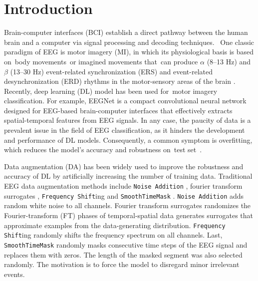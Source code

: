 \documentclass[runningheads]{llncs}
\begin{document}
\section{Introduction}

Brain-computer interfaces (BCI) establish a direct pathway between the human brain and a computer via signal processing and decoding techniques.  One classic paradigm of EEG is motor imagery (MI), in which its physiological basis is based on body movements or imagined movements that can produce $\alpha$ (8–13 Hz) and $\beta$ (13–30 Hz) event-related synchronization (ERS) and event-related desynchronization (ERD) rhythms in the motor-sensory areas of the brain \cite{wolpaw2013brain}. Recently, deep learning (DL) model has been used for motor imagery classification. For example, EEGNet \cite{lawhern2018eegnet} is a compact convolutional neural network designed for EEG-based brain-computer interfaces that effectively extracts spatial-temporal features from EEG signals. In any case, the paucity of data is a prevalent issue in the field of EEG classification, as it hinders the development and performance of DL models.  Consequently, a common symptom is overfitting, which reduces the model's accuracy and robustness on test set \cite{bilbao2017overfitting}. 

Data augmentation (DA) has been widely used to improve the robustness and accuracy of DL by artificially increasing the number of training data.  Traditional EEG data augmentation methods include \texttt{Noise Addition} \cite{wang2018data,parvan2019transfer,li2019channel}, fourier transform surrogates \cite{schwabedal2018addressing}, \texttt{Frequency Shift}ing \cite{rommel2021cadda,rommel2022data} and \texttt{\texttt{SmoothTimeMask}} \cite{mohsenvand2020contrastive}. 
\texttt{Noise Addition} \cite{li2019channel,parvan2019transfer} adds random white noise to all channels.  Fourier transform surrogates \cite{schwabedal2018addressing} randomizes the Fourier-transform (FT) phases of temporal-spatial data generates surrogates that approximate examples from the data-generating distribution. \texttt{Frequency Shift}ing \cite{rommel2021cadda,rommel2022data} randomly shifts the frequency spectrum on all channels. Last, \texttt{\texttt{SmoothTimeMask}} \cite{mohsenvand2020contrastive} randomly masks consecutive time steps of the EEG signal and replaces them with zeros. The length of the masked segment was also selected randomly.   The motivation is to force the model to disregard minor irrelevant events.
\end{document}
